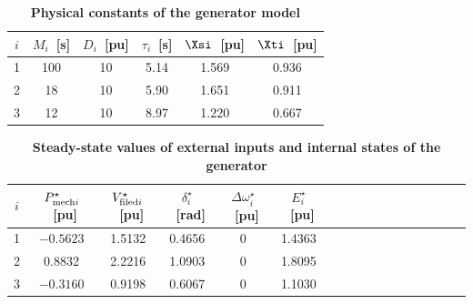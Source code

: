 \documentclass[graybox, envcountchap]{svmult}
\begin{document}
\begin{table}[h]
\medskip
 \caption{\textbf{Physical constants of the generator model}}
 \label{table:genparams}
 \centering
  \begin{tabular}{cccccc}
   \hline
$i$ &  $M_i$~[s] & $D_i$~[pu] & $\tau_i$~[s] & $\Xsi$~[pu] & $\Xti$~[pu] \\
   \hline \hline
1 & 100 & 10 & 5.14 & 1.569 & 0.936 \\
   \hline
2 & 18 & 10 & 5.90 & 1.651 & 0.911 \\
   \hline
3 & 12 & 10 & 8.97 & 1.220 & 0.667 \\
   \hline
  \end{tabular}
\end{table}

\begin{table}[h]
\medskip
 \caption{\textbf{Steady-state values of external inputs and internal states of the generator}}
 \label{table:gensteady}
 \centering
  \begin{tabular}{ccccccccccccccccc}
   \hline
$i$ &  $P_{{\rm mech}i}^{\star}$~[pu] & $V_{{\rm filed}i}^{\star}$~[pu] & $\delta_i^{\star}$~[rad] & $\Delta \omega_i^{\star}$~[pu] & $E_i^{\star}$~[pu] \\
   \hline \hline
1 & $-0.5623$ & 1.5132 & 0.4656 & 0 & 1.4363 \\
2 & 0.8832 & 2.2216 & 1.0903 & 0 & 1.8095 \\
3 & $-0.3160$ & 0.9198 & 0.6067 & 0 & 1.1030 \\
   \hline
  \end{tabular}
\end{table}
\end{document}
